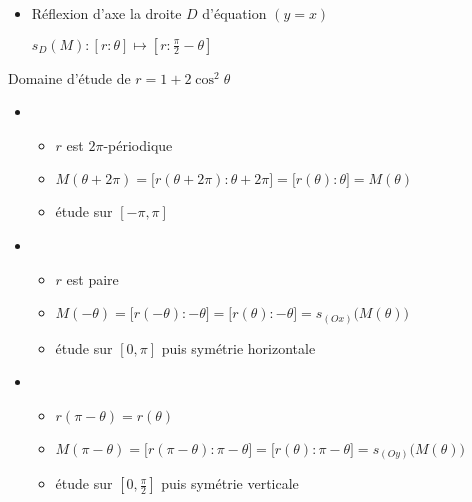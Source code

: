 \begin{frame}
\begin{itemize}
    
  \item Réflexion d'axe la droite $D$ d'équation $(y=x)$
\centerline{$s_D(M) : [r:\theta] \mapsto [r:\frac{\pi}{2}-\theta]$}
   
\end{itemize}    

\end{frame}



\begin{frame}

\begin{exemple}

Domaine d'étude de $r=1+2\cos^2\theta$

\vspace*{-1ex}
\begin{itemize}
  \item 
  \begin{itemize}
    \pause\item $r$ est $2\pi$-périodique
    \pause\item $M(\theta+2\pi)=\big[r(\theta+2\pi):\theta+2\pi\big]=\big[r(\theta):\theta\big]=M(\theta)$
    \pause\item étude sur $[-\pi,\pi]$
  \end{itemize}
  

  
   \item
  \begin{itemize}  
    \pause\item $r$ est paire
    \pause\item $M(-\theta)=\big[r(-\theta):-\theta\big]=\big[r(\theta):-\theta\big]=s_{(Ox)}\big(M(\theta)\big)$
    \pause\item étude sur $[0,\pi]$ puis symétrie horizontale  
  \end{itemize}   
  
  \item
  \begin{itemize}  
    \pause\item $r(\pi-\theta)=r(\theta)$
    \pause\item $M(\pi-\theta)=\big[r(\pi-\theta):\pi-\theta\big]=\big[r(\theta):\pi-\theta\big]=s_{(Oy)}\big(M(\theta)\big)$
    \pause\item étude sur $[0,\frac\pi2]$ puis symétrie verticale
  \end{itemize}
\end{itemize}

\pause
\vspace*{-3ex}


\end{exemple}
	

\end{frame}




